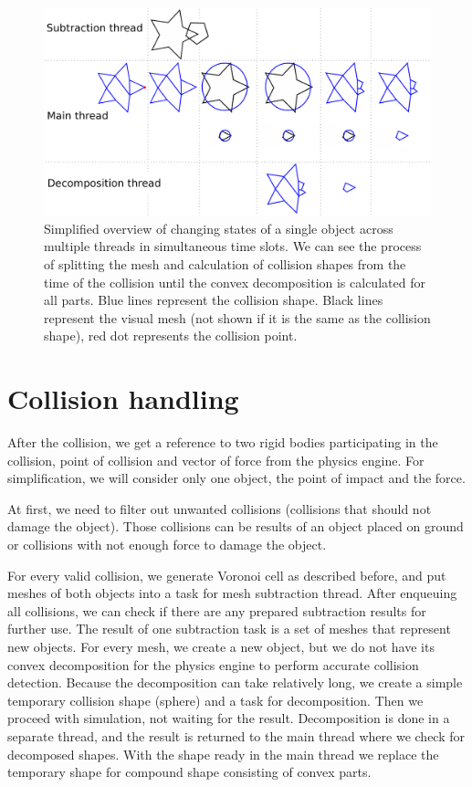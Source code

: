 \begin{figure}
        \centering
        \includegraphics[width=\textwidth]{img/object-progress}
        \caption{Simplified overview of changing states of a single object across multiple threads in simultaneous time slots. We can see the process of splitting the mesh and calculation of collision shapes from the time of the collision until the convex decomposition is calculated for all parts. Blue lines represent the collision shape. Black lines represent the visual mesh (not shown if it is the same as the collision shape), red dot represents the collision point.}
        \label{fig:objectInThreads}
\end{figure}

\section{Collision handling}
\label{sec:collisions}
After the collision, we get a reference to two rigid bodies participating in the collision, point of collision and vector of force from the physics engine. For simplification, we will consider only one object, the point of impact and the force.

At first, we need to filter out unwanted collisions (collisions that should not damage the object). Those collisions can be results of an object placed on ground or collisions with not enough force to damage the object. 

For every valid collision, we generate Voronoi cell as described before, and put  meshes of both objects into a task for mesh subtraction thread. After enqueuing all collisions, we can check if there are any prepared subtraction results for further use. The result of one subtraction task is a set of meshes that represent new objects. For every mesh, we create a new object, but we do not have its convex decomposition for the physics engine to perform accurate collision detection. Because the decomposition can take relatively long, we create a simple temporary collision shape (\eg sphere) and a task for decomposition. Then we proceed with simulation, not waiting for the result. Decomposition is done in a separate thread, and the result is returned to the main thread where we check for decomposed shapes. With the shape ready in the main thread we replace the temporary shape for compound shape consisting of convex parts.

